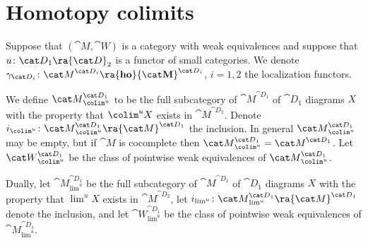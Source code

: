 \section{Homotopy colimits}
\label{sec:hocolimcolimdirect}
Suppose that $({\cat M}, {\cat W})$ is a category with weak equivalences and suppose that $u \colon {\cat D}_1 \ra {\cat D}_2$ is a functor of small categories. We denote $\gamma_{{\cat D}_i} \colon {\cat M}^{{\cat D}_i} \ra {\bf ho} {\cat M}^{{\cat D}_i}$, $i = 1, 2$ the localization functors.

We define ${\cat M}^{{\cat D}_1}_{{\colim}^u}$ to be the full subcategory of ${\cat M}^{{\cat D}_1}$ of ${\cat D}_1$ diagrams $X$ with the property that $\colim^uX$ exists in ${\cat M}^{{\cat D}_2}$. Denote $i_{\colim^u} \colon {\cat M}^{{\cat D}_1}_{{\colim}^u} \ra {\cat M}^{{\cat D}_1}$ the inclusion. In general ${\cat M}^{{\cat D}_1}_{{\colim}^u}$ may be empty, but if ${\cat M}$ is cocomplete then ${\cat M}^{{\cat D}_1}_{{\colim}^u} = {\cat M}^{{\cat D}_1}$. Let ${\cat W}^{{\cat D}_1}_{{\colim}^u}$ be the class of pointwise weak equivalences of ${\cat M}^{{\cat D}_1}_{{\colim}^u}$. 

Dually, let ${\cat M}^{{\cat D}_1}_{{\lim}^u}$ be the full subcategory of ${\cat M}^{{\cat D}_1}$ of ${\cat D}_1$ diagrams $X$ with the property that $\lim^uX$ exists in ${\cat M}^{{\cat D}_2}$, let $i_{\lim^u} \colon {\cat M}^{{\cat D}_1}_{{\lim}^u} \ra {\cat M}^{{\cat D}_1}$ denote the inclusion, and let ${\cat W}^{{\cat D}_1}_{{\lim}^u}$ be the class of pointwise weak equivalences of ${\cat M}^{{\cat D}_1}_{{\lim}^u}$.

